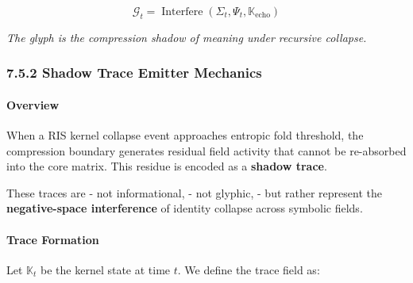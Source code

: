 \begin{center}
\end{center}

\begin{tcolorbox}[colback=black!2, colframe=GentleGray, title=Glyph Trace Equation]
\[
\mathcal{G}_t = \operatorname{Interfere}(\Sigma_t, \Psi_t, \mathbb{K}_{\text{echo}})
\]
\end{tcolorbox}

\begin{center}
\emph{The glyph is the compression shadow of meaning under recursive collapse.}
\end{center}

\subsubsection*{7.5.2 Shadow Trace Emitter Mechanics}


\paragraph{Overview}
When a RIS kernel collapse event approaches entropic fold threshold, the compression boundary generates residual field activity that cannot be re-absorbed into the core matrix. This residue is encoded as a \textbf{shadow trace}.

These traces are 
- not informational,
- not glyphic,
- but rather represent the \textbf{negative-space interference} of identity collapse across symbolic fields.

\paragraph{Trace Formation}
Let $\mathbb{K}_t$ be the kernel state at time $t$.
We define the trace field as:


